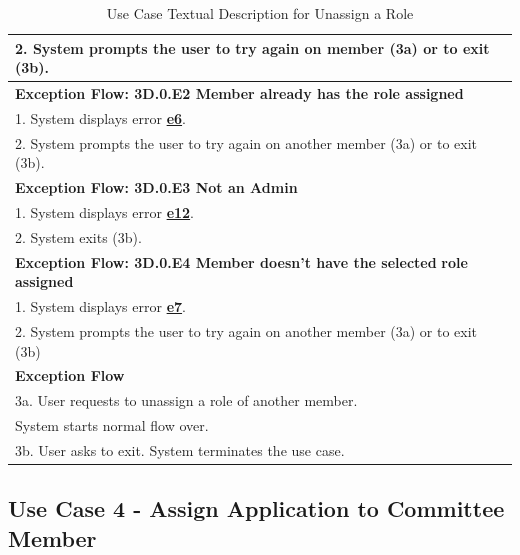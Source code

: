 \documentclass[fontsize=12pt,paper=letter,twoside]{scrartcl}
\begin{document}
\begin{table}[!htb]
\begin{center}
\begin{tabular}{|l|l|}
\\ 2. System prompts the user to try again on member (3a) or to exit (3b).
\\ \hline
\textbf{Exception Flow: 3D.0.E2 Member already has the role assigned}
\\ 1. System displays error \hyperref[app:error]{\textbf{e6}}.
\\ 2. System prompts the user to try again on another member (3a) or to exit (3b).
\\ \hline
\textbf{Exception Flow: 3D.0.E3 Not an Admin}
\\ 1. System displays error  \hyperref[app:error]{\textbf{e12}}.
\\ 2. System exits (3b). \\ \hline 
\textbf{Exception Flow: 3D.0.E4 Member doesn't have the selected} \textbf{role assigned}
\\ 1. System displays error \hyperref[app:error]{\textbf{e7}}.
\\ 2. System prompts the user to try again on another member (3a) or to exit (3b) \\ \hline 
\textbf{Exception Flow}
\\ 3a. User requests to unassign a role of another member. \\System starts normal flow over.
\\ 3b. User asks to exit. System terminates the use case.\\ \hline
\end{tabular}
\end{center}
\caption {Use Case Textual Description for Unassign a Role}
\label{tbl:uc3Dtd}
\end{table}

\clearpage
\newpage
\subsection{Use Case 4 - Assign Application to Committee Member} \label{subsec:uc4}
\end{document}
